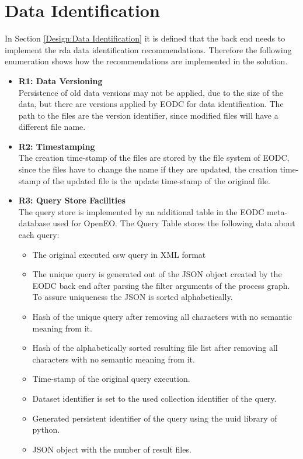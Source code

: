 \documentclass[draft,final]{vutinfth} %
\begin{document}
\section{Data Identification}\label{Evaluation:dataidentification}
In Section \ref{Design:Data Identification} it is defined that the back end needs to implement the \acrshort{rda} data identification recommendations. Therefore the following enumeration shows how the recommendations are implemented in the solution. 
\begin{itemize}
	\item \textbf{R1: Data Versioning} \\
	Persistence of old data versions may not be applied, due to the size of the data, but there are versions applied by EODC for data identification. The path to the files are the version identifier, since modified files will have a different file name.
	\item \textbf{R2: Timestamping} \\
	The creation time-stamp of the files are stored by the file system of EODC, since the files have to change the name if they are updated, the creation time-stamp of the updated file is the update time-stamp of the original file. 
	\item \textbf{R3: Query Store Facilities} \\
	The query store is implemented by an additional table in the EODC meta-database used for OpenEO. The Query Table stores the following data about each query:
	\begin{itemize}
		\item The original executed \acrshort{csw} query in XML format
		\item The unique query is generated out of the JSON object created by the EODC back end after parsing the filter arguments of the process graph. To assure uniqueness the JSON is sorted alphabetically.
		\item Hash of the unique query after removing all characters with no semantic meaning from it.
		\item Hash of the alphabetically sorted resulting file list after removing all characters with no semantic meaning from it. 
		\item Time-stamp of the original query execution.
		\item Dataset identifier is set to the used collection identifier of the query.
		\item Generated persistent identifier of the query using the uuid library of python.
		\item JSON object with the number of result files.

\end{itemize}
\end{itemize}
\end{document}
